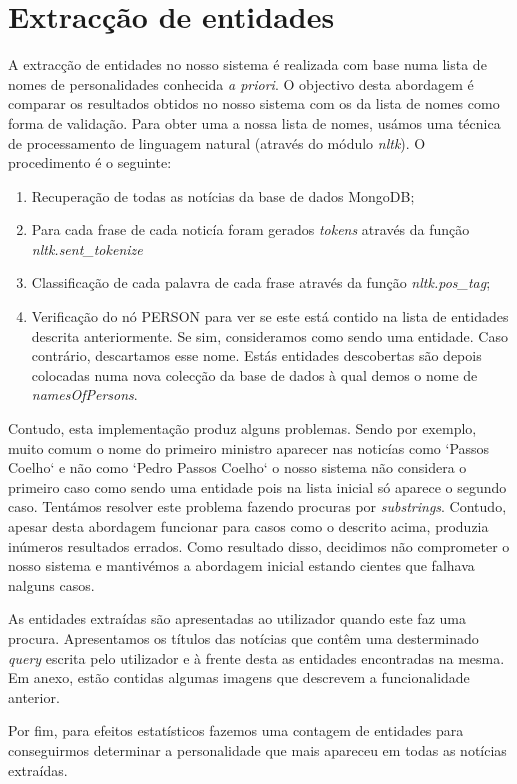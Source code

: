 \section{Extracção de entidades}
A extracção de entidades no nosso sistema é realizada com base numa lista de nomes de personalidades conhecida \textit{a priori}. O objectivo desta abordagem é comparar os resultados obtidos no nosso sistema com os da lista de nomes como forma de validação. Para obter uma a nossa lista de nomes, usámos uma técnica de processamento de linguagem natural (através do módulo \textit{nltk}). O procedimento é o seguinte:


\begin{enumerate}
  \item Recuperação de todas as notícias da base de dados MongoDB;
  \item Para cada frase de cada noticía foram gerados \textit{tokens} através da função \textit{nltk.sent\_tokenize}
  \item Classificação de cada palavra de cada frase através da função \textit{nltk.pos\_tag};
  \item Verificação do nó PERSON para ver se este está contido na lista de entidades descrita anteriormente. Se sim, consideramos como sendo uma entidade. Caso contrário, descartamos esse nome. Estás entidades descobertas são depois colocadas numa nova colecção da base de dados à qual demos o nome de \textit{namesOfPersons}. 
\end{enumerate}

Contudo, esta implementação produz alguns problemas. Sendo por exemplo, muito comum o nome do primeiro ministro aparecer nas noticías como `Passos Coelho` e não como `Pedro Passos Coelho` o nosso sistema não considera o primeiro caso como sendo uma entidade pois na lista inicial só aparece o segundo caso. Tentámos resolver este problema fazendo procuras por \textit{substrings}. Contudo, apesar desta abordagem funcionar para casos como o descrito acima, produzia inúmeros resultados errados. Como resultado disso, decidimos não comprometer o nosso sistema e mantivémos a abordagem inicial estando cientes que falhava nalguns casos.

As entidades extraídas são apresentadas ao utilizador quando este faz uma procura. Apresentamos os títulos das notícias que contêm uma desterminado \textit{query} escrita pelo utilizador e à frente desta as entidades encontradas na mesma. Em anexo, estão contidas algumas imagens que descrevem a funcionalidade anterior.

Por fim, para efeitos estatísticos fazemos uma contagem de entidades para conseguirmos determinar a personalidade que mais apareceu em todas as notícias extraídas.


